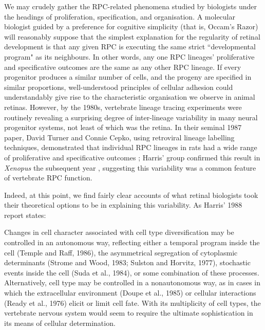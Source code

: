 We may crudely gather the RPC-related phenomena studied by biologists under the headings of proliferation, specification, and organisation. A molecular biologist guided by a preference for cognitive simplicity (that is, Occam's Razor) will reasonably suppose that the simplest explanation for the regularity of retinal development is that any given RPC is executing the same strict ``developmental program" as its neighbours. In other words, any one RPC lineages' proliferative and specificative outcomes are the same as any other RPC lineage. If every progenitor produces a similar number of cells, and the progeny are specified in similar proportions, well-understood principles of cellular adhesion could understandably give rise to the characteristic organisation we observe in animal retinas. However, by the 1980s, vertebrate lineage tracing experiments were routinely revealing a surprising degree of inter-lineage variability in many neural progenitor systems, not least of which was the retina. In their seminal 1987 paper, David Turner and Connie Cepko, using retroviral lineage labelling techniques, demonstrated that individual RPC lineages in rats had a wide range of proliferative and specificative outcomes \cite{Turner1987}; Harris' group confirmed this result in \textit{Xenopus} the subsequent year \cite{Holt1988}, suggesting this variability was a common feature of vertebrate RPC function.

Indeed, at this point, we find fairly clear accounts of what retinal biologists took their theoretical options to be in explaining this variability. As Harris' 1988 report states:

\begin{longquote}
Changes in cell character associated with cell type diversification may be controlled in an autonomous way, reflecting either a temporal program inside the cell (Temple and Raff, 1986), the asymmetrical segregation of cytoplasmic determinants (Strome and Wood,
1983; Sulston and Horvitz, 1977), stochastic events inside the cell (Suda et al., 1984), or some combination of
these processes. Alternatively, cell type may be controlled in a nonautonomous way, as in cases in which
the extracellular environment (Doupe et al., 1985) or
cellular interactions (Ready et al., 1976) elicit or limit cell
fate. With its multiplicity of cell types, the vertebrate nervous system would seem to require the ultimate sophistication in its means of cellular determination. 
\cite{Holt1988}
\end{longquote}

